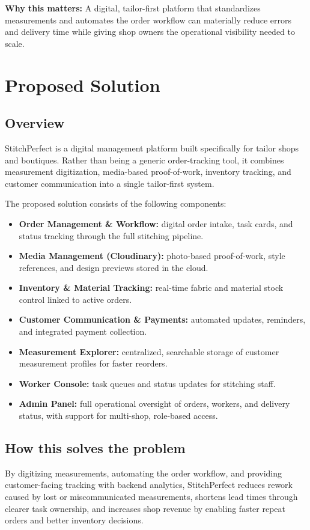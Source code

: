 \documentclass[11pt]{article}
\begin{document}
\noindent\textbf{Why this matters:} A digital, tailor-first platform that standardizes measurements and
automates the order workflow can materially reduce errors and delivery time while giving shop
owners the operational visibility needed to scale.

\section{Proposed Solution}

\subsection{Overview}
StitchPerfect is a digital management platform built specifically for tailor shops and boutiques.
Rather than being a generic order-tracking tool, it combines measurement digitization,
media-based proof-of-work, inventory tracking, and customer communication into a single
tailor-first system.

The proposed solution consists of the following components:

\begin{itemize}[leftmargin=1.5em]
  \item \textbf{Order Management \& Workflow:} digital order intake, task cards, and status
        tracking through the full stitching pipeline.
  \item \textbf{Media Management (Cloudinary):} photo-based proof-of-work, style references,
        and design previews stored in the cloud.
  \item \textbf{Inventory \& Material Tracking:} real-time fabric and material stock control
        linked to active orders.
  \item \textbf{Customer Communication \& Payments:} automated updates, reminders, and
        integrated payment collection.
  \item \textbf{Measurement Explorer:} centralized, searchable storage of customer measurement
        profiles for faster reorders.
  \item \textbf{Worker Console:} task queues and status updates for stitching staff.
  \item \textbf{Admin Panel:} full operational oversight of orders, workers, and delivery status,
        with support for multi-shop, role-based access.
\end{itemize}

\subsection{How this solves the problem}
By digitizing measurements, automating the order workflow, and providing customer-facing
tracking with backend analytics, StitchPerfect reduces rework caused by lost or miscommunicated
measurements, shortens lead times through clearer task ownership, and increases shop revenue by
enabling faster repeat orders and better inventory decisions.
\end{document}
